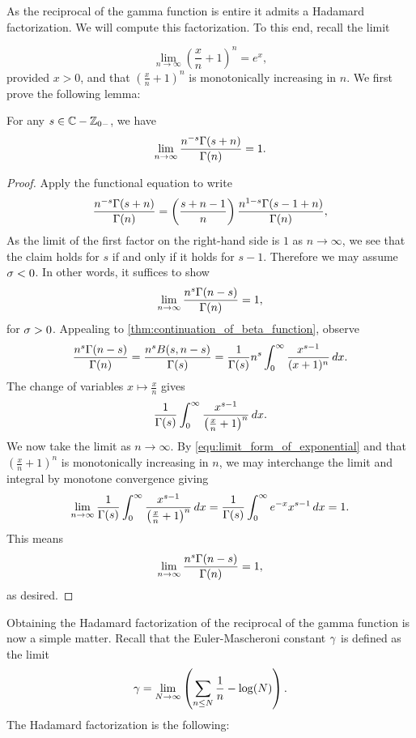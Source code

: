     As the reciprocal of the gamma function is entire it admits a Hadamard factorization. We will compute this factorization. To this end, recall the limit

    \begin{equation}\label{equ:limit_form_of_exponential}
      \lim_{n \to \infty}\left(\frac{x}{n}+1\right)^{n} = e^{x},
    \end{equation}
    provided \(x > 0\), and that \(\left(\frac{x}{n}+1\right)^{n}\) is monotonically increasing in \(n\). We first prove the following lemma:

    \begin{lemma}\label{lem:Hadamard_factorization_of_gamma_function_lemma}
      For any \(s \in \mathbb{C}-\mathbb{Z}_{0-}\), we have
      \[
        \lim_{n \to \infty}\frac{n^{-s}\Gamma(s+n)}{\Gamma(n)} = 1.
      \]
    \end{lemma}
    \begin{proof}
      Apply the functional equation to write
      \[
        \frac{n^{-s}\Gamma(s+n)}{\Gamma(n)} = \left(\frac{s+n-1}{n}\right)\frac{n^{1-s}\Gamma(s-1+n)}{\Gamma(n)},
      \]
      As the limit of the first factor on the right-hand side is \(1\) as \(n \to \infty\), we see that the claim holds for \(s\) if and only if it holds for \(s-1\). Therefore we may assume \(\sigma < 0\). In other words, it suffices to show
      \[
        \lim_{n \to \infty}\frac{n^{s}\Gamma(n-s)}{\Gamma(n)} = 1,
      \]
      for \(\sigma > 0\). Appealing to \cref{thm:continuation_of_beta_function}, observe
      \[
        \frac{n^{s}\Gamma(n-s)}{\Gamma(n)} = \frac{n^{s}B(s,n-s)}{\Gamma(s)} = \frac{1}{\Gamma(s)}n^{s}\int_{0}^{\infty}\frac{x^{s-1}}{(x+1)^{n}}\,dx.
      \]
      The change of variables \(x \mapsto \frac{x}{n}\) gives
      \[ 
        \frac{1}{\Gamma(s)}\int_{0}^{\infty}\frac{x^{s-1}}{\left(\frac{x}{n}+1\right)^{n}}\,dx.
      \]
      We now take the limit as \(n \to \infty\). By \cref{equ:limit_form_of_exponential} and that \(\left(\frac{x}{n}+1\right)^{n}\) is monotonically increasing in \(n\), we may interchange the limit and integral by monotone convergence giving
      \[
        \lim_{n \to \infty}\frac{1}{\Gamma(s)}\int_{0}^{\infty}\frac{x^{s-1}}{\left(\frac{x}{n}+1\right)^{n}}\,dx = \frac{1}{\Gamma(s)}\int_{0}^{\infty}e^{-x}x^{s-1}\,dx = 1.
      \]
      This means
      \[
        \lim_{n \to \infty}\frac{n^{s}\Gamma(n-s)}{\Gamma(n)} = 1,
      \]
      as desired.
    \end{proof}

    Obtaining the Hadamard factorization of the reciprocal of the gamma function is now a simple matter. Recall that the Euler-Mascheroni constant \(\gamma\) is defined as the limit
    \begin{equation}\label{equ:Euler-Mascheroni_constant_definition}
      \gamma = \lim_{N \to \infty}\left(\sum_{n \le N}\frac{1}{n}-\log(N)\right).
    \end{equation}
    The Hadamard factorization is the following:

